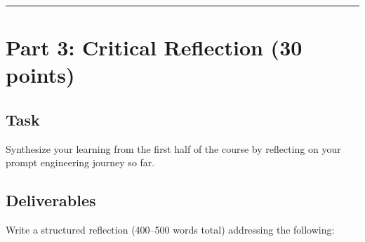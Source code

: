 \documentclass[11pt]{article}
\begin{document}
\hrule
\vspace{0.5cm}

\section{Part 3: Critical Reflection (30 points)}

\subsection*{Task}

Synthesize your learning from the first half of the course by reflecting on your prompt engineering journey so far.

\subsection*{Deliverables}

Write a structured reflection (400--500 words total) addressing the following:
\end{document}
